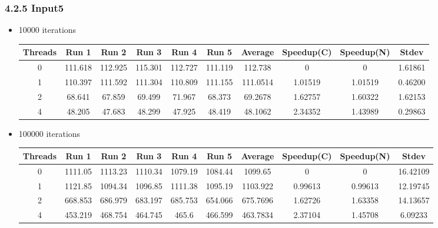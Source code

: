 \documentclass{article}
\begin{document}
\subsubsection*{4.2.5 Input5} 
 \begin{itemize}
\item 10000 iterations
\begin{center}
 \begin{adjustbox}{width=\columnwidth, center} 
 \begin{tabular}{ | |c | c c c c c | c | c c | c | |} \hline 
 Threads & Run 1 & Run 2 & Run 3 & Run 4 & Run 5 & Average & Speedup(C) & Speedup(N) & Stdev \\ [0.5ex] 
 \hline 
 \hline 
0& 111.618 & 112.925 & 115.301 & 112.727 & 111.119 & 112.738 & 0 & 0 & 1.61861\\ 
 \hline
1& 110.397 & 111.592 & 111.304 & 110.809 & 111.155 & 111.0514 & 1.01519 & 1.01519 & 0.46200\\ 
 \hline
2& 68.641 & 67.859 & 69.499 & 71.967 & 68.373 & 69.2678 & 1.62757 & 1.60322 & 1.62153\\ 
 \hline
4& 48.205 & 47.683 & 48.299 & 47.925 & 48.419 & 48.1062 & 2.34352 & 1.43989 & 0.29863\\ 
 \hline
\end{tabular} 
 \end{adjustbox} 
 \end{center} 
\item 100000 iterations
\begin{center}
 \begin{adjustbox}{width=\columnwidth, center} 
 \begin{tabular}{ | |c | c c c c c | c | c c | c | |} \hline 
 Threads & Run 1 & Run 2 & Run 3 & Run 4 & Run 5 & Average & Speedup(C) & Speedup(N) & Stdev \\ [0.5ex] 
 \hline 
 \hline 
0& 1111.05 & 1113.23 & 1110.34 & 1079.19 & 1084.44 & 1099.65 & 0 & 0 & 16.42109\\ 
 \hline
1& 1121.85 & 1094.34 & 1096.85 & 1111.38 & 1095.19 & 1103.922 & 0.99613 & 0.99613 & 12.19745\\ 
 \hline
2& 668.853 & 686.979 & 683.197 & 685.753 & 654.066 & 675.7696 & 1.62726 & 1.63358 & 14.13657\\ 
 \hline
4& 453.219 & 468.754 & 464.745 & 465.6 & 466.599 & 463.7834 & 2.37104 & 1.45708 & 6.09233\\ 
 \hline
\end{tabular} 
 \end{adjustbox} 
 \end{center} 
\end{itemize}
\end{document}
